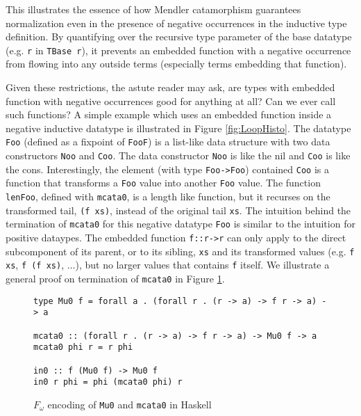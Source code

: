 \documentclass[letterpaper,12pt]{article}
\begin{document}
This illustrates the essence of how Mendler catamorphism guarantees
normalization even in the presence of negative occurrences in the
inductive type definition. By quantifying over the recursive type
parameter of the base datatype (e.g. \verb|r| in \verb|TBase r|), it prevents an
embedded function with a negative occurrence from flowing into any
outside terms (especially terms embedding that function).

Given these restrictions, the astute reader may ask, are types with
embedded function with negative occurrences good for anything at all?
Can we ever call such functions?  A simple example which uses an
embedded function inside a negative inductive datatype is illustrated
in Figure \ref{fig:LoopHisto}.  The datatype \verb|Foo| (defined as a fixpoint
of \verb|FooF|) is a list-like data structure with two data constructors \verb|Noo|
and \verb|Coo|.  The data constructor \verb|Noo| is like the nil and \verb|Coo| is like
the cons.  Interestingly, the element (with type \verb|Foo->Foo|) contained \verb|Coo|
is a function that transforms a \verb|Foo| value into another \verb|Foo| value.
The function \verb|lenFoo|, defined with \verb|mcata0|, is a length like function,
but it recurses on the transformed tail, \verb|(f xs)|,
instead of the original tail \verb|xs|.
The intuition behind the termination of \verb|mcata0| for this negative datatype
\verb|Foo| is similar to the intuition for positive dataypes.  The embedded function
\verb|f::r->r| can only apply to the direct subcomponent of its parent, or to its
sibling, \verb|xs| and its transformed values (e.g. \verb|f xs|, \verb|f (f xs)|, $\ldots$),
but no larger values that contains \verb|f| itself.  We illustrate a general proof
on termination of \verb|mcata0| in Figure \ref{fig:proof}.

\begin{figure}
\begin{verbatim}
type Mu0 f = forall a . (forall r . (r -> a) -> f r -> a) -> a

mcata0 :: (forall r . (r -> a) -> f r -> a) -> Mu0 f -> a
mcata0 phi r = r phi

in0 :: f (Mu0 f) -> Mu0 f
in0 r phi = phi (mcata0 phi) r
\end{verbatim}
\caption{$F_{\omega}$ encoding of \texttt{Mu0} and \texttt{mcata0} in Haskell}
\label{fig:proof}
\end{figure}
\end{document}
